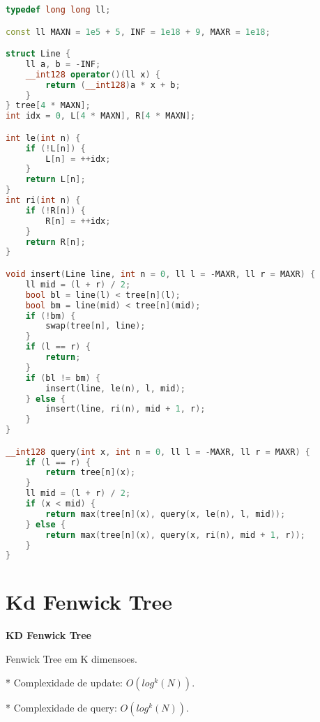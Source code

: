 \documentclass[11pt, a4paper, oneside]{book}
\begin{document}
\hfill

\begin{multicols}{2}
\begin{lstlisting}[language=C++]
typedef long long ll;

const ll MAXN = 1e5 + 5, INF = 1e18 + 9, MAXR = 1e18;

struct Line {
    ll a, b = -INF;
    __int128 operator()(ll x) {
        return (__int128)a * x + b;
    }
} tree[4 * MAXN];
int idx = 0, L[4 * MAXN], R[4 * MAXN];

int le(int n) {
    if (!L[n]) {
        L[n] = ++idx;
    }
    return L[n];
}
int ri(int n) {
    if (!R[n]) {
        R[n] = ++idx;
    }
    return R[n];
}

void insert(Line line, int n = 0, ll l = -MAXR, ll r = MAXR) {
    ll mid = (l + r) / 2;
    bool bl = line(l) < tree[n](l);
    bool bm = line(mid) < tree[n](mid);
    if (!bm) {
        swap(tree[n], line);
    }
    if (l == r) {
        return;
    }
    if (bl != bm) {
        insert(line, le(n), l, mid);
    } else {
        insert(line, ri(n), mid + 1, r);
    }
}

__int128 query(int x, int n = 0, ll l = -MAXR, ll r = MAXR) {
    if (l == r) {
        return tree[n](x);
    }
    ll mid = (l + r) / 2;
    if (x < mid) {
        return max(tree[n](x), query(x, le(n), l, mid));
    } else {
        return max(tree[n](x), query(x, ri(n), mid + 1, r));
    }
}
\end{lstlisting}
\end{multicols}

\hfill

\section{Kd Fenwick Tree}


\textbf{KD Fenwick Tree} 



Fenwick Tree em K dimensoes.



* Complexidade de update: $O(log^k(N))$.

* Complexidade de query: $O(log^k(N))$.
\hfill
\end{document}
